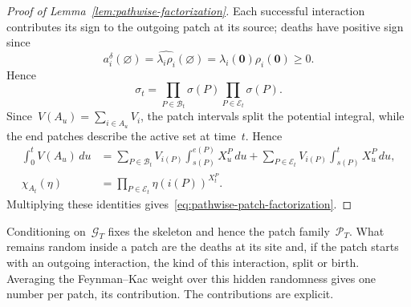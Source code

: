 \documentclass[EJP,preprint,NODS,nobera]{ejpecp}
\newcommand{\bb}[1]{\left(#1\right)}
\newcommand{\mb}[1]{\mathbf{#1}}
\begin{document}
\begin{proof}[Proof of Lemma~\ref{lem:pathwise-factorization}]
Each successful interaction contributes its sign to the outgoing patch at
its source; deaths have positive sign since
\begin{equation*}
a_i^\delta(\varnothing)
=
\widehat{\lambda_i\rho_i}(\varnothing)
=
\lambda_i(\mb 0)\rho_i(\mb 0)
\geq0.
\end{equation*}
Hence
\begin{equation*}
\sigma_t
=
\prod_{P\in\mathcal B_t}\sigma(P)
\prod_{P\in\mathcal E_t}\sigma(P).
\end{equation*}
Since~$V(A_u)=\sum_{i\in A_u}V_i$, the patch intervals split the potential
integral, while the end patches describe the active set at time~$t$. Hence
\begin{align*}
\int_0^tV(A_u)\,du
&=
\sum_{P\in\mathcal B_t}
V_{i(P)}\int_{s(P)}^{e(P)}X_u^P\,du
+
\sum_{P\in\mathcal E_t}
V_{i(P)}\int_{s(P)}^tX_u^P\,du,
\\
\chi_{A_t}(\eta)
&=
\prod_{P\in\mathcal E_t}
\eta\bb{i(P)}^{X_t^P}.
\end{align*}
Multiplying these identities gives~\eqref{eq:pathwise-patch-factorization}.
\end{proof}

Conditioning on~$\mathcal G_T$ fixes the skeleton and hence the patch
family~$\mathcal P_T$. What remains random inside a patch are the deaths at
its site and, if the patch starts with an outgoing interaction, the kind of
this interaction, split or birth. Averaging the Feynman--Kac weight over this
hidden randomness gives one number per patch, its contribution. The
contributions are explicit.
\end{document}
